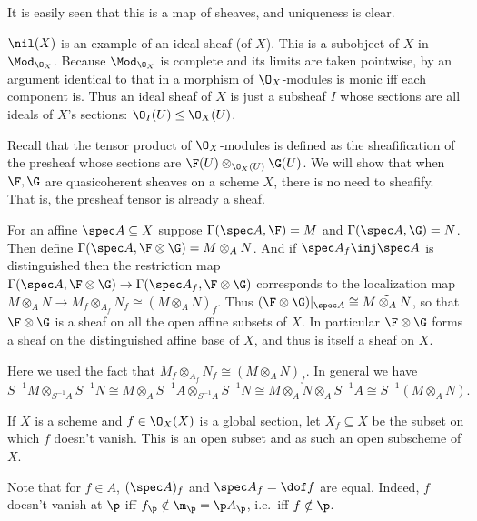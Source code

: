 It is easily seen that this is a map of sheaves, and uniqueness is clear.

\bnote

    $\nil(X)$ is an example of an {\emphcolor ideal sheaf} (of $X$).
    This is a subobject of $X$ in $\Mod_{\O_X}$.
    Because $\Mod_{\O_X}$ is complete and its limits are taken pointwise, by an argument identical to that in  a morphism of $\O_X$-modules
    is monic iff each component is.
    Thus an ideal sheaf of $X$ is just a subsheaf $I$ whose sections are all ideals of $X$'s sections: $\O_I(U)\leq\O_X(U)$.

\enote

Recall that the tensor product of $\O_X$-modules is defined as the sheafification of the presheaf whose sections are $\F(U)\otimes_{\O_X(U)}\G(U)$.
We will show that when $\F,\G$ are quasicoherent sheaves on a scheme $X$, there is no need to sheafify.
That is, the presheaf tensor is already a sheaf.

For an affine $\spec A\subseteq X$ suppose $\Gamma(\spec A,\F)=M$ and $\Gamma(\spec A,\G)=N$.
Then define $\Gamma(\spec A,\F\otimes\G)=M\otimes_AN$.
And if $\spec A_f\inj\spec A$ is distinguished then the restriction map $\Gamma(\spec A,\F\otimes\G)\to\Gamma(\spec A_f,\F\otimes\G)$ corresponds to the localization map
$M\otimes_A N\to M_f\otimes_{A_f} N_f\cong(M\otimes_AN)_f$.
Thus $(\F\otimes\G)|_{\spec A}\cong\tilde{M\otimes_AN}$, so that $\F\otimes\G$ is a sheaf on all the open affine subsets of $X$.
In particular $\F\otimes\G$ forms a sheaf on the distinguished affine base of $X$, and thus is itself a sheaf on $X$.

\bnote

    Here we used the fact that $M_f\otimes_{A_f}N_f\cong(M\otimes_AN)_f$.
    In general we have
    $$ S^{-1}M\otimes_{S^{-1}A}S^{-1}N \cong M\otimes_AS^{-1}A\otimes_{S^{-1}A}S^{-1}N \cong M\otimes_AN\otimes_AS^{-1}A \cong S^{-1}(M\otimes_AN) . $$

\enote

\bdefn

    If $X$ is a scheme and $f\in\O_X(X)$ is a global section, let $X_f\subseteq X$ be the subset on which $f$ doesn't vanish.
    This is an open subset and as such an open subscheme of $X$.

\edefn

Note that for $f\in A$, $(\spec A)_f$ and $\spec A_f=\dof f$ are equal.
Indeed, $f$ doesn't vanish at $\p$ iff $f_\p\notin\m_\p=\p A_\p$, i.e.\ iff $f\notin\p$.

